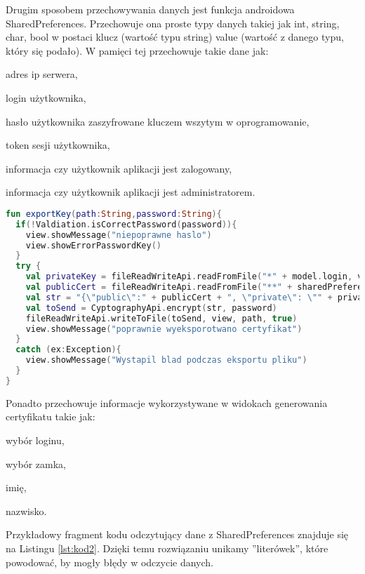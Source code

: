 \documentclass[twoside,10pt]{article}
\begin{document}
Drugim sposobem przechowywania danych jest funkcja androidowa SharedPreferences. Przechowuje ona proste typy danych takiej jak int, string, char, bool w postaci klucz (wartość typu string) value (wartość z danego typu, który się podało). W pamięci tej przechowuje takie dane jak:
\begin{itemize*}
\item adres ip serwera,
\item login użytkownika,
\item hasło użytkownika zaszyfrowane kluczem wszytym w oprogramowanie,
\item token sesji użytkownika,
\item informacja czy użytkownik aplikacji jest zalogowany,
\item informacja czy użytkownik aplikacji jest administratorem.
\end{itemize*}
\newpage
\begin{lstlisting}[caption={Funkcja eksportująca klucz szyfrujący.}, label={lst:kod1}, language=Kotlin]
fun exportKey(path:String,password:String){
  if(!Valdiation.isCorrectPassword(password)){
    view.showMessage("niepoprawne haslo")
    view.showErrorPasswordKey()
  }
  try {
    val privateKey = fileReadWriteApi.readFromFile("*" + model.login, view)
    val publicCert = fileReadWriteApi.readFromFile("**" + sharedPreferenceApi.getString(view, EnumChoice.login), view)
    val str = "{\"public\":" + publicCert + ", \"private\": \"" + privateKey + "\"}"
    val toSend = CyptographyApi.encrypt(str, password)
    fileReadWriteApi.writeToFile(toSend, view, path, true)
    view.showMessage("poprawnie wyeksporotwano certyfikat")
  }
  catch (ex:Exception){
    view.showMessage("Wystapil blad podczas eksportu pliku")
  }
}
\end{lstlisting}

Ponadto przechowuje informacje wykorzystywane w widokach generowania certyfikatu takie jak:
\begin{itemize*}
\item wybór loginu,
\item wybór zamka,
\item imię, 
\item nazwisko.
\end{itemize*}

Przykładowy fragment kodu odczytujący dane z SharedPreferences znajduje się na Listingu \ref{lst:kod2}. Dzięki temu rozwiązaniu unikamy ''literówek'', które powodować, by mogły błędy w odczycie danych. 
\end{document}

